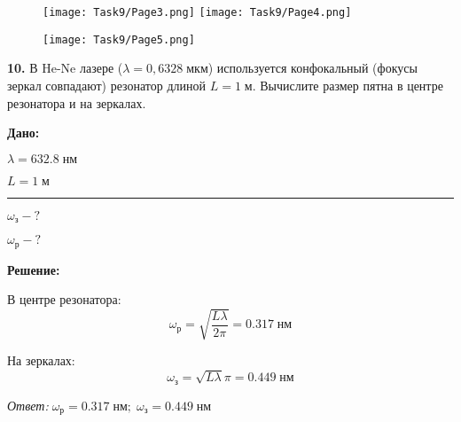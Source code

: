 \documentclass[a4paper,12pt]{article}
\begin{document}
\begin{figure}[htbp]
    \centering
    \texttt{[image: Task9/Page3.png]}
    \texttt{[image: Task9/Page4.png]}
    \label{fig:task9_2}
\end{figure}

\begin{figure}[htbp]
    \centering
    \texttt{[image: Task9/Page5.png]}
    \label{fig:task9_3}
\end{figure}

\textbf{10.} В He-Ne лазере ($\lambda = 0,6328\; мкм$) используется конфокальный (фокусы зеркал совпадают) резонатор длиной $L = 1\; м$. Вычислите размер пятна в центре резонатора и на зеркалах.
\begin{center}
\begin{minipage}[t]{0.15\linewidth}
    \textbf{Дано:}
    
  $\lambda = 632.8 \; нм$
  
  $L = 1 \; м $
   
    \vspace{0.1in}
    \hrule
    \vspace{0.1in}
    $\omega_з - ?$
    
    $\omega_р - ? $
\end{minipage}
\vline
\begin{minipage}[t]{0.65\linewidth}
\setlength{\parindent}{2ex}
    \textbf{Решение:}
    
    В центре резонатора:
    \begin{equation*}
        \omega_р = \sqrt{\frac{L \lambda }{2 \pi}} = 0.317 \; нм
    \end{equation*}
    
    На зеркалах:
    \begin{equation*}
        \omega_з = \sqrt{L \lambda }{\pi} = 0.449 \; нм
    \end{equation*}
\end{minipage}
\end{center}
\textit{Ответ:}$\; \omega_р = 0.317 \; нм ; \; \omega_з =0.449 \; нм$

\end{document}

